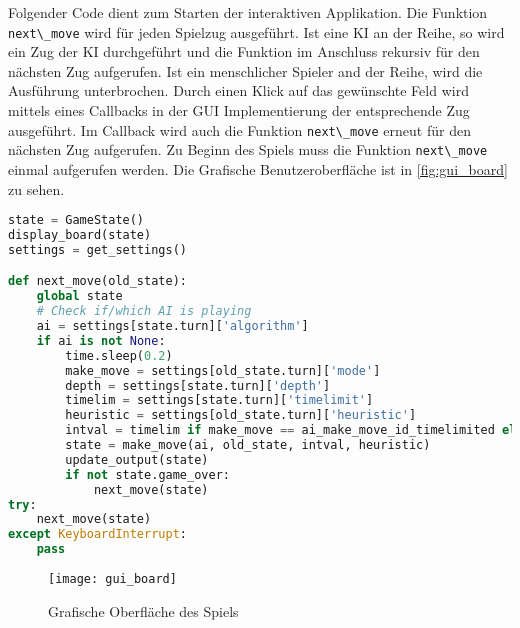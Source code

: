 Folgender Code dient zum Starten der interaktiven Applikation. Die
Funktion \passthrough{\lstinline!next\_move!} wird für jeden Spielzug
ausgeführt. Ist eine KI an der Reihe, so wird ein Zug der KI
durchgeführt und die Funktion im Anschluss rekursiv für den nächsten Zug
aufgerufen. Ist ein menschlicher Spieler and der Reihe, wird die
Ausführung unterbrochen. Durch einen Klick auf das gewünschte Feld wird
mittels eines Callbacks in der GUI Implementierung der entsprechende Zug
ausgeführt. Im Callback wird auch die Funktion
\passthrough{\lstinline!next\_move!} erneut für den nächsten Zug
aufgerufen. Zu Beginn des Spiels muss die Funktion
\passthrough{\lstinline!next\_move!} einmal aufgerufen werden. Die
Grafische Benutzeroberfläche ist in \autoref{fig:gui_board} zu sehen.

\begin{lstlisting}[language=Python]
state = GameState()
display_board(state)
settings = get_settings()

def next_move(old_state):
    global state
    # Check if/which AI is playing
    ai = settings[state.turn]['algorithm']
    if ai is not None:
        time.sleep(0.2)
        make_move = settings[old_state.turn]['mode']
        depth = settings[state.turn]['depth']
        timelim = settings[state.turn]['timelimit']
        heuristic = settings[old_state.turn]['heuristic']
        intval = timelim if make_move == ai_make_move_id_timelimited else depth
        state = make_move(ai, old_state, intval, heuristic)
        update_output(state)
        if not state.game_over:
            next_move(state)
try:
    next_move(state)
except KeyboardInterrupt:
    pass
\end{lstlisting}

\begin{figure}[H]
    \centering
    \texttt{[image: gui\_board]}
    \caption{Grafische Oberfläche des Spiels}
    \label{fig:gui_board}
\end{figure}
